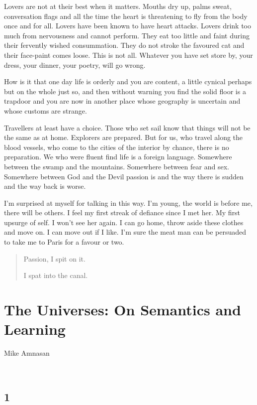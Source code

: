 \documentclass[
]{memoir}
\begin{document}
Lovers are not at their best when it matters. Mouths dry up, palms
sweat, conversation flags and all the time the heart is threatening to
fly from the body once and for all. Lovers have been known to have heart
attacks. Lovers drink too much from nervousness and cannot perform. They
eat too little and faint during their fervently wished consummation.
They do not stroke the favoured cat and their face-paint comes loose.
This is not all. Whatever you have set store by, your dress, your
dinner, your poetry, will go wrong.

How is it that one day life is orderly and you are content, a little
cynical perhaps but on the whole just so, and then without warning you
find the solid floor is a trapdoor and you are now in another place
whose geography is uncertain and whose customs are strange.

Travellers at least have a choice. Those who set sail know that things
will not be the same as at home. Explorers are prepared. But for us, who
travel along the blood vessels, who come to the cities of the interior
by chance, there is no preparation. We who were fluent find life is a
foreign language. Somewhere between the swamp and the mountains.
Somewhere between fear and sex. Somewhere between God and the Devil
passion is and the way there is sudden and the way back is worse.

I'm surprised at myself for talking in this way. I'm young, the world is
before me, there will be others. I feel my first streak of defiance
since I met her. My first upsurge of self. I won't see her again. I can
go home, throw aside these clothes and move on. I can move out if I
like. I'm sure the meat man can be persuaded to take me to Paris for a
favour or two.

\begin{quote}
Passion, I spit on it.

I spat into the canal.
\end{quote}

\hypertarget{the-universes-on-semantics-and-learning}{%
\chapter{The Universes: On Semantics and
Learning}\label{the-universes-on-semantics-and-learning}}

Mike Amnasan

~

\hypertarget{section-14}{%
\section*{1}\label{section-14}}
\end{document}
